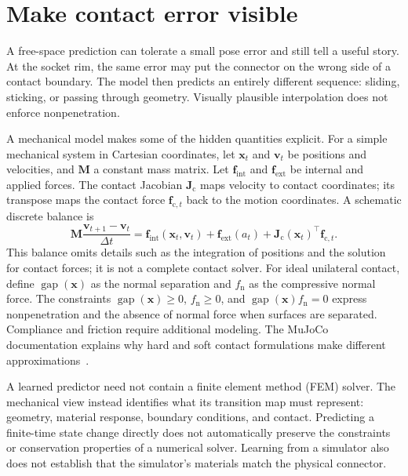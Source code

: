 \section{Make contact error visible}
A free-space prediction can tolerate a small pose error and still tell a useful story. At the socket rim, the same error may put the connector on the wrong side of a contact boundary. The model then predicts an entirely different sequence: sliding, sticking, or passing through geometry. Visually plausible interpolation does not enforce nonpenetration.

A mechanical model makes some of the hidden quantities explicit. For a simple mechanical system in Cartesian coordinates, let $\mathbf x_t$ and $\mathbf v_t$ be positions and velocities, and $\mathbf M$ a constant mass matrix. Let $\mathbf f_{\mathrm{int}}$ and $\mathbf f_{\mathrm{ext}}$ be internal and applied forces. The contact Jacobian $\mathbf J_{\mathrm c}$ maps velocity to contact coordinates; its transpose maps the contact force $\mathbf f_{\mathrm c,t}$ back to the motion coordinates. A schematic discrete balance is
\begin{equation}
 \mathbf M\frac{\mathbf v_{t+1}-\mathbf v_t}{\Delta t}
 =\mathbf f_{\mathrm{int}}(\mathbf x_t,\mathbf v_t)
  +\mathbf f_{\mathrm{ext}}(a_t)
  +\mathbf J_{\mathrm c}(\mathbf x_t)^\top\mathbf f_{\mathrm c,t}.
 \label{eq:middle-contact}
\end{equation}
This balance omits details such as the integration of positions and the solution for contact forces; it is not a complete contact solver. For ideal unilateral contact, define $\operatorname{gap}(\mathbf x)$ as the normal separation and $f_{\mathrm n}$ as the compressive normal force. The constraints $\operatorname{gap}(\mathbf x)\geq0$, $f_{\mathrm n}\geq0$, and $\operatorname{gap}(\mathbf x)f_{\mathrm n}=0$ express nonpenetration and the absence of normal force when surfaces are separated. Compliance and friction require additional modeling. The MuJoCo documentation explains why hard and soft contact formulations make different approximations~\citep{mujococomputation}.

A learned predictor need not contain a finite element method (FEM) solver. The mechanical view instead identifies what its transition map must represent: geometry, material response, boundary conditions, and contact. Predicting a finite-time state change directly does not automatically preserve the constraints or conservation properties of a numerical solver. Learning from a simulator also does not establish that the simulator's materials match the physical connector.

